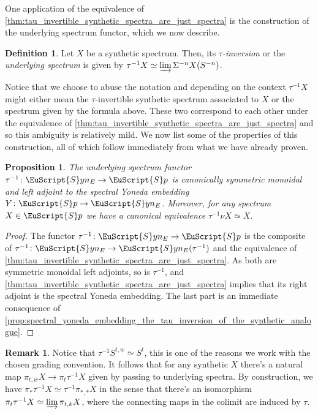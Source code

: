 \documentclass[oneside,a4paper]{amsart}
\newcommand{\euscr}[1]{\EuScript{#1}} %
\newcommand{\spectra}{\euscr{S}p} %
\newcommand{\synspectra}{\euscr{S}yn} %
\theoremstyle{plain}
\newtheorem{prop}[thm]{Proposition}
\theoremstyle{definition}
\newtheorem{defin}[thm]{Definition}
\newtheorem{rem}[thm]{Remark}
\theoremstyle{remark}
\begin{document}
One application of the equivalence of \cref{thm:tau_invertible_synthetic_spectra_are_just_spectra} is the construction of the underlying spectrum functor, which we now describe. 

\begin{defin}
\label{defin:tau_inverison_aka_underlying_spectrum}
Let $X$ be a synthetic spectrum. Then, its \emph{$\tau$-inversion} or the \emph{underlying spectrum} is given by $\tau^{-1} X \simeq \varinjlim \Sigma^{-n} X(S^{-n})$. 
\end{defin}
Notice that we choose to abuse the notation and depending on the context $\tau^{-1} X$ might either mean the $\tau$-invertible synthetic spectrum associated to $X$ or the spectrum given by the formula above. These two correspond to each other under the equivalence of \cref{thm:tau_invertible_synthetic_spectra_are_just_spectra} and so this ambiguity is relatively mild. We now list some of the properties of this construction, all of which follow immediately from what we have already proven. 

\begin{prop}
\label{prop:tau_inversion_cocontinuous_symmetric_monoidal_left_inverse_to_synthetic_analogue}
The underlying spectrum functor $\tau^{-1} \colon \synspectra_{E} \rightarrow \spectra$ is canonically symmetric monoidal and left adjoint to the spectral Yoneda embedding $Y \colon \spectra \rightarrow \synspectra_{E}$. Moreover, for any spectrum $X \in \spectra$ we have a canonical equivalence $\tau^{-1} \nu X \simeq X$.
\end{prop}

\begin{proof}
The functor $\tau^{-1} \colon \synspectra_{E} \rightarrow \spectra$ is the composite of $\tau^{-1} \colon \synspectra_{E} \rightarrow \synspectra_{E}(\tau^{-1})$ and the equivalence of \cref{thm:tau_invertible_synthetic_spectra_are_just_spectra}. As both are symmetric monoidal left adjoints, so is $\tau^{-1}$, and \cref{thm:tau_invertible_synthetic_spectra_are_just_spectra} implies that its right adjoint is the spectral Yoneda embedding. The last part is an immediate consequence of \cref{prop:spectral_yoneda_embedding_the_tau_inversion_of_the_synthetic_analogue}. 
\end{proof}

\begin{rem}
\label{rem:homotopy_of_underlying_spectrum_of_a_synthetic_one}
Notice that $\tau^{-1} S^{t, w} \simeq S^{t}$, this is one of the reasons we work with the chosen grading convention. It follows that for any synthetic $X$ there's a natural map $\pi_{t, w} X \rightarrow \pi_{t} \tau^{-1} X$ given by passing to underlying spectra. By construction, we have $\pi_{*} \tau^{-1} X \simeq \tau^{-1} \pi_{*, *} X$ in the sense that there's an isomorphism $\pi_{t} \tau^{-1} X \simeq \varinjlim \pi_{t, k} X$, where the connecting maps in the colimit are induced by $\tau$.  
\end{rem}
\end{document}
